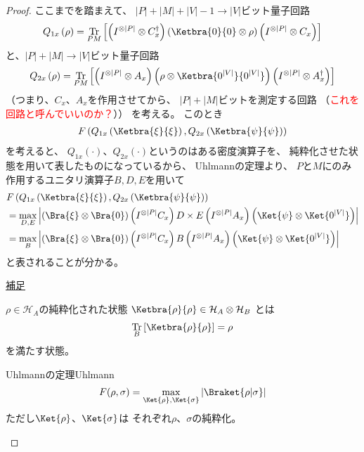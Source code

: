 \documentclass[a4paper, 10pt]{jsarticle}
\DeclareMathOperator{\Tr}{Tr}
\begin{document}
\begin{proof}
	ここまでを踏まえて、
	$|P| + |M| + |V| - 1 \to |V|$ビット量子回路
	\begin{gather}
		Q_{1x} \left( \rho \right)
		= \Tr_{PM} \left[ \left( I^{\otimes |P|} \otimes C^\dagger_x \right)
		\left( \Ketbra{0}{0} \otimes \rho \right)
		\left( I^{\otimes |P|} \otimes C_x  \right) \right]
	\end{gather}
	と、$|P| + |M| \to |V|$ビット量子回路
	\begin{gather}
		Q_{2x} \left( \rho \right)
		= \Tr_{PM} \left[ \left( I^{\otimes |P|} \otimes A_x \right)
		\left( \rho \otimes \Ketbra{0^{|V|}}{0^{|V|}} \right)
		\left( I^{\otimes |P|} \otimes A^\dagger_x  \right) \right]
	\end{gather}
	（つまり、$C_x$、$A_x$を作用させてから、
	$|P| + |M|$ビットを測定する回路
	（\textcolor{red}{これを回路と呼んでいいのか？}））
	を考える。
	このとき
	\begin{align}
		F\left( Q_{1x} \left( \Ketbra{\xi}{\xi} \right),
		Q_{2x} \left( \Ketbra{\psi}{\psi} \right) \right)
	\end{align}
	を考えると、
	$Q_{1x}(\cdot)$、$Q_{2x}(\cdot)$というのはある密度演算子を、
	純粋化させた状態を用いて表したものになっているから、
	Uhlmannの定理より、
	$P$と$M$にのみ作用するユニタリ演算子$B, D, E$を用いて
	\begin{align}
		&F\left( Q_{1x} \left( \Ketbra{\xi}{\xi} \right),
		Q_{2x} \left( \Ketbra{\psi}{\psi} \right) \right) \\
		&= \max_{D, E} \left|
			\left( \Bra{\xi} \otimes \Bra{0} \right)
			\left( I^{\otimes |P|} C_x \right)
			D \times E
			\left( I^{\otimes |P|} A_x \right)
			\left( \Ket{\psi} \otimes \Ket{0^{|V|}} \right)
		\right| \\
		 &= \max_{B} \left|
			\left( \Bra{\xi} \otimes \Bra{0} \right)
			\left( I^{\otimes |P|} C_x \right)
			B
			\left( I^{\otimes |P|} A_x \right)
			\left( \Ket{\psi} \otimes \Ket{0^{|V|}} \right)
		 \right|
	\end{align}
	と表されることが分かる。
	\begin{tcolorbox}[
	enhanced,
	colback = white,
	boxrule = 0.5pt,
	arc=2mm,
	breakable
	]
		\underline{補足}
	
		$\rho \in \mathcal{H}_A$の純粋化された状態
		$\Ketbra{\rho}{\rho} \in \mathcal{H}_A \otimes \mathcal{H}_B$
		とは
		\begin{align}
			\Tr_B \left[ \Ketbra{\rho}{\rho} \right] = \rho
		\end{align}
		を満たす状態。
	\end{tcolorbox}
	\begin{thm}{Uhlmannの定理}{Uhlmann}
		\begin{align}
			F(\rho, \sigma)
			= \max_{\Ket{\rho}, \Ket{\sigma}}
			\left| \Braket{\rho | \sigma} \right|
		\end{align}
		ただし$\Ket{\rho}$、$\Ket{\sigma}$は
		それぞれ$\rho$、$\sigma$の純粋化。
	\end{thm}
	

\end{proof}
\end{document}
